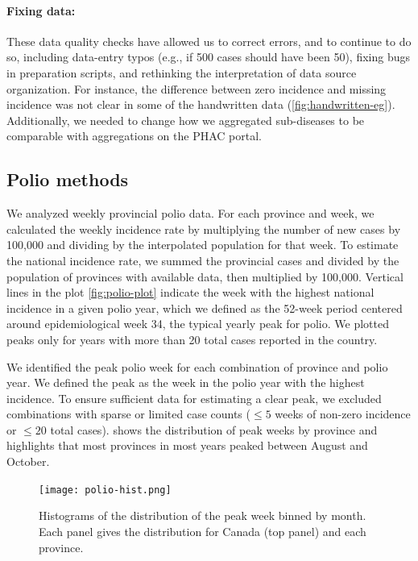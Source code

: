 \documentclass[12pt]{article}
\begin{document}
\paragraph{Fixing data:} These data quality checks have allowed us to correct errors, and to continue to do so, including data-entry typos (e.g., if 500 cases should have been 50), fixing bugs in preparation scripts, and rethinking the interpretation of data source organization. For instance, the difference between zero incidence and missing incidence was not clear in some of the handwritten data (\cref{fig:handwritten-eg}). Additionally, we needed to change how we aggregated sub-diseases to be comparable with aggregations on the PHAC portal.

\subsection{Polio methods}\label{sec:appendix-polio}

We analyzed weekly provincial polio data. For each province and week, we calculated the weekly incidence rate by multiplying the number of new cases by 100,000 and dividing by the interpolated population for that week. To estimate the national incidence rate, we summed the provincial cases and divided by the population of provinces with available data, then multiplied by 100,000. Vertical lines in the plot \cref{fig:polio-plot} indicate the week with the highest national incidence in a given polio year, which we defined as the 52-week period centered around epidemiological week 34, the typical yearly peak for polio. We plotted peaks only for years with more than 20 total cases reported in the country.

We identified the peak polio week for each combination of province and polio year. We defined the peak as the week in the polio year with the highest incidence. To ensure sufficient data for estimating a clear peak, we excluded combinations with sparse or limited case counts ($\le 5$ weeks of non-zero incidence or $\le 20$ total cases).  shows the distribution of peak weeks by province and highlights that most provinces in most years peaked between August and October.

\begin{figure}
\texttt{[image: polio-hist.png]}
\caption{Histograms of the distribution of the peak week binned by month.
Each panel gives the distribution for Canada (top panel) and each province.}\label{fig:polio-peak-month}
\end{figure}
\end{document}
